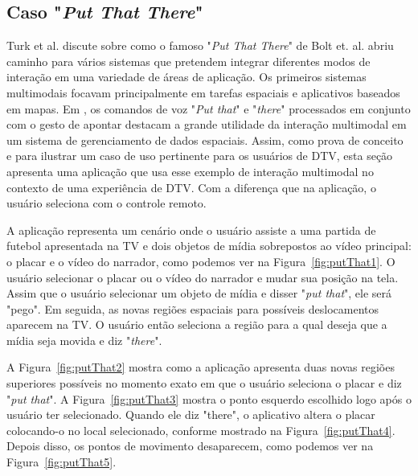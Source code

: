 \subsection{Caso "\textit{Put That There}"}

Turk et al.\cite{turk2014multimodal} discute sobre como o famoso "\textit{Put That There}" de Bolt et. al.\cite{bolt1980put} abriu caminho para vários sistemas que pretendem integrar diferentes modos de interação em uma variedade de áreas de aplicação. Os primeiros sistemas multimodais focavam principalmente em tarefas espaciais e aplicativos baseados em mapas. Em \cite{bolt1980put}, os comandos de voz "\textit{Put that}" e "\textit{there}" processados em conjunto com o gesto de apontar destacam a grande utilidade da interação multimodal em um sistema de gerenciamento de dados espaciais. Assim, como prova de conceito e para ilustrar um caso de uso pertinente para os usuários de DTV, esta seção apresenta uma aplicação que usa esse exemplo de interação multimodal no contexto de uma experiência de DTV. Com a diferença que na aplicação, o usuário seleciona com o controle remoto.

A aplicação representa um cenário onde o usuário assiste a uma partida de futebol apresentada na TV e dois objetos de mídia sobrepostos ao vídeo principal: o placar e o vídeo do narrador, como podemos ver na Figura~\ref{fig:putThat1}. O usuário selecionar o placar ou o vídeo do narrador e mudar sua posição na tela. Assim que o usuário selecionar um objeto de mídia e disser "\textit{put that}", ele será "pego". Em seguida, as novas regiões espaciais para possíveis deslocamentos aparecem na TV. O usuário então seleciona a região para a qual deseja que a mídia seja movida e diz "\textit{there}".

A Figura~\ref{fig:putThat2} mostra como a aplicação apresenta duas novas regiões superiores possíveis no momento exato em que o usuário seleciona o placar e diz "\textit{put that}". A Figura~\ref{fig:putThat3} mostra o ponto esquerdo escolhido logo após o usuário ter selecionado. Quando ele diz "there", o aplicativo altera o placar colocando-o no local selecionado, conforme mostrado na Figura~\ref{fig:putThat4}. Depois disso, os pontos de movimento desaparecem, como podemos ver na Figura~\ref{fig:putThat5}.

